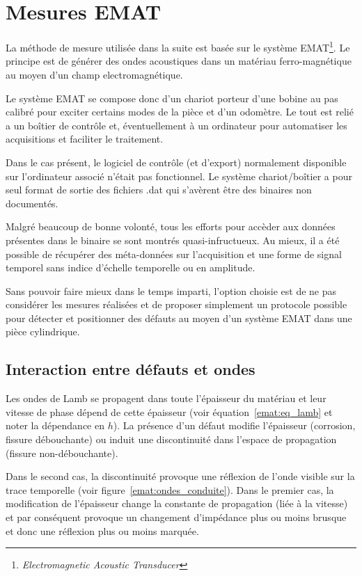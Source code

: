 \section{Mesures EMAT}

La méthode de mesure utilisée dans la suite est basée sur le système EMAT\footnote{\textit{Electromagnetic Acoustic Transducer}}. Le principe est de générer des ondes acoustiques dans un matériau ferro-magnétique au moyen d'un champ electromagnétique.

Le système EMAT se compose donc d'un chariot porteur d'une bobine au pas calibré pour exciter certains modes de la pièce et d'un odomètre. Le tout est relié a un boîtier de contrôle et, éventuellement à un ordinateur pour automatiser les acquisitions et faciliter le traitement.

Dans le cas présent, le logiciel de contrôle (et d'export) normalement disponible sur l'ordinateur associé n'était pas fonctionnel. Le système chariot/boîtier a pour seul format de sortie des fichiers .dat qui s'avèrent être des binaires non documentés.

Malgré beaucoup de bonne volonté, tous les efforts pour accèder aux données présentes dans le binaire se sont montrés quasi-infructueux. Au mieux, il a été possible de récupérer des méta-données sur l'acquisition et une forme de signal temporel sans indice d'échelle temporelle ou en amplitude.

Sans pouvoir faire mieux dans le temps imparti, l'option choisie est de ne pas considérer les mesures réalisées et de proposer simplement un protocole possible pour détecter et positionner des défauts au moyen d'un système EMAT dans une pièce cylindrique.

\subsection{Interaction entre défauts et ondes}

Les ondes de Lamb se propagent dans toute l'épaisseur du matériau et leur vitesse de phase dépend de cette épaisseur (voir équation~\eqref{emat:eq_lamb} et noter la dépendance en $h$). La présence d'un défaut modifie l'épaisseur (corrosion, fissure débouchante) ou induit une discontinuité dans l'espace de propagation (fissure non-débouchante).

Dans le second cas, la discontinuité provoque une réflexion de l'onde visible sur la trace
temporelle (voir figure~\ref{emat:ondes_conduite}). Dans le premier cas, la modification de l'épaisseur change la constante de propagation (liée à la vitesse) et par conséquent provoque un changement d'impédance plus ou moins brusque et donc une réflexion plus ou moins marquée.

